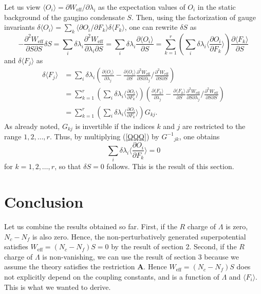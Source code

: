 \documentclass[a4paper,12pt]{article}
\def\ex#1{\langle#1\rangle}
\def\W#1{W_{\text{#1}}}
\begin{document}
Let us view $\ex{O_i}=\partial\W{eff}/\partial\lambda_i$
as the expectation values of $O_i$ in the static background of the
gaugino condensate $S$.
Then, using the factorization of gauge invariants
$\delta\ex{O_i}=\sum_k\ex{\partial O_i/ \partial F_k}\delta\ex{F_k}$,
one can rewrite $\delta S$ as\begin{equation}
-\frac{\partial^2\W{eff}}{\partial S\partial S}\delta S
=\sum_i \delta\lambda_i\frac{\partial^2\W{eff}}{\partial\lambda_i\partial S}
=\sum_i \delta\lambda_i\frac{\partial\ex{O_i}}{\partial S}
=\sum_{k=1}^r\left(
\sum_i\delta\lambda_i\ex{\frac{\partial O_i}{\partial F_k}}\right)
\frac{\partial\ex{F_k}}{\partial S}
\end{equation}and $\delta\ex{F_j}$ as\begin{align}
\delta\ex{F_j}&=\sum_i\delta\lambda_i
\left(\frac{\partial \ex{O_i}}{\partial\lambda_j}
-\frac{\partial \ex{O_i}}{\partial S}
\frac{\partial^2\W{eff}}{\partial S\partial\lambda_j}\Big/
\frac{\partial^2\W{eff}}{\partial S\partial S}\right)\nonumber\\
&=\sum_{k=1}^r
\left(\sum_i\delta\lambda_i\ex{\frac{\partial{O_i}}{\partial{F_k}}}\right)
\left(\frac{\partial \ex{F_k}}{\partial\lambda_j}
-\frac{\partial \ex{F_k}}{\partial S}
\frac{\partial^2\W{eff}}{\partial S\partial\lambda_j}\Big/
\frac{\partial^2\W{eff}}{\partial S\partial S}\right)\nonumber\\
&=\sum_{k=1}^r
\left(\sum_i\delta\lambda_i\ex{\frac{\partial{O_i}}{\partial{F_k}}}\right)
G_{kj}.\label{QQQ}
\end{align} 
As already noted, $G_{kj}$ is invertible
if the indices $k$ and $j$ are restricted to the range $1,2,\ldots, r$.
Thus, by multiplying (\ref{QQQ}) by $G^{-1}{}_{jk}$, one obtains
\begin{equation}
\sum_i\delta\lambda_i\ex{\frac{\partial{O_i}}{\partial{F_k}}}=0
\end{equation}for $k=1,2,\ldots, r$, so that $\delta S=0$  follows.
This is the result of this section.

\section{Conclusion}
Let us combine the results obtained so far.
First, if the $R$ charge of $\Lambda$ is zero, $N_c-N_f$ is also zero.
Hence, the non-perturbatively generated superpotential satisfies
$\W{eff}=(N_c-N_f)S=0$ by the result of section 2.
Second, if the $R$ charge of $\Lambda$ is non-vanishing,
we  can use the result of section 3 because we assume
the theory satisfies the restriction \textbf{A}.
Hence $\W{eff}=(N_c-N_f)S$ 
does not explicitly depend on the coupling constants, and 
 is a function of $\Lambda$ and $\ex{F_i}$. 
This is what we wanted to derive.
\end{document}

